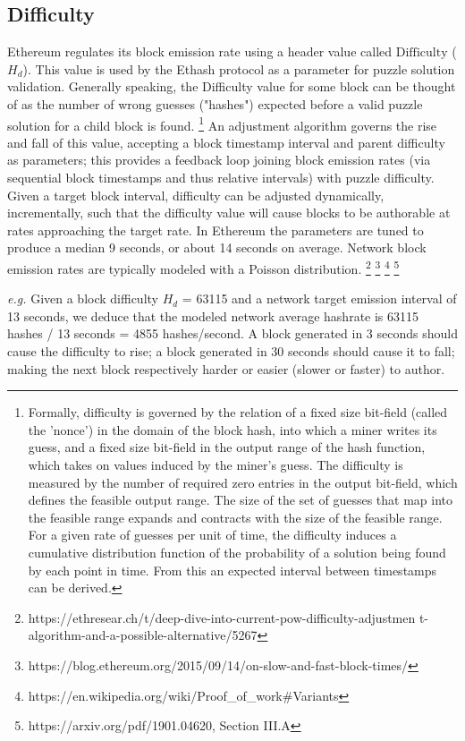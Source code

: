\documentclass[11pt]{article}
\theoremstyle{plain}
\begin{document}
\subsection{\small{Difficulty}}\label{sec: S1.2}
Ethereum regulates its block emission rate using a header value called
$\mathrm{Difficulty}$ ($H_d$). This value is used by the Ethash protocol as a
parameter for puzzle solution validation. Generally speaking, the Difficulty
value for some block can be thought of as the number of wrong guesses
("hashes") expected before a valid puzzle solution for a child block is
found.\nolinebreak
\footnote{Formally, difficulty is governed by the relation of a fixed size
bit-field (called the 'nonce') in the domain of the block hash, into which a 
miner writes its guess, and a fixed size bit-field in the output range of the 
hash function, which takes on values induced by the miner's guess. The 
difficulty is measured by the number of required zero entries in the output  
bit-field, which defines the feasible output range.  The size of the set of 
guesses that map into the feasible range expands and contracts with the size of 
the feasible range. For a given rate of guesses per unit of time, the 
difficulty induces a cumulative distribution function of the probability of a 
solution being found by each point in time. From this an expected interval 
between timestamps can be derived.}
An adjustment algorithm governs the rise and fall of this value, accepting a 
block timestamp interval and parent difficulty as parameters;
this provides a feedback loop joining block emission rates (via sequential 
block timestamps and thus relative intervals) with puzzle difficulty.
Given a target block interval, difficulty can be adjusted dynamically, 
incrementally, such that the difficulty value will cause blocks to be authorable
at rates approaching the target rate.
In Ethereum the parameters are tuned to produce a median 9 seconds, or about 14
seconds on average.
Network block emission rates are typically modeled with a Poisson
distribution.\nolinebreak
\footnote{https://ethresear.ch/t/deep-dive-into-current-pow-difficulty-adjustmen
t-algorithm-and-a-possible-alternative/5267}\nolinebreak
\footnote{https://blog.ethereum.org/2015/09/14/on-slow-and-fast-block-times/}\nolinebreak
\footnote{https://en.wikipedia.org/wiki/Proof_of_work#Variants}\nolinebreak
\footnote{https://arxiv.org/pdf/1901.04620, Section III.A}

\textit{e.g.} Given a block difficulty $H_d$ = 63115 and a network target
emission interval of 13 seconds, we deduce that the modeled network average
hashrate is 63115 hashes / 13 seconds = 4855 hashes/second. A block generated
in 3 seconds should cause the difficulty to rise; a block generated in 30
seconds should cause it to fall; making the next block respectively harder or
easier (slower or faster) to author.
\end{document}
